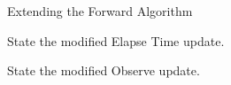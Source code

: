 \begin{problem}{Extending the Forward Algorithm}
\begin{question}[3]
State the modified Elapse Time update.\\
\end{question}

\begin{question}[3]
State the modified Observe update.\\
\end{question}


\end{problem}

